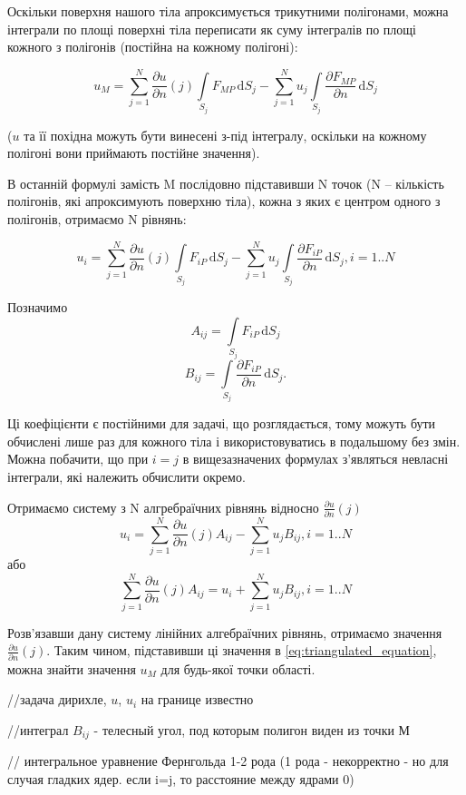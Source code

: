 \documentclass[a4paper,12pt]{article}
\begin{document}
Оскільки поверхня нашого тіла апроксимується трикутними полігонами, можна інтеграли по площі поверхні тіла переписати як суму інтегралів по площі кожного з полігонів (постійна на кожному полігоні):

\begin{equation} \label{eq:triangulated_equation}
u_M = \sum_{j=1}^{N} \frac{\partial u}{\partial n}(j) \int\limits_{S_j} F_{MP} \, \mathrm{d}S_j - \sum_{j=1}^{N} u_j \int\limits_{S_j} \frac{\partial F_{MP}}{\partial n} \, \mathrm{d}S_j
\end{equation}

($u$ та її похідна можуть бути винесені з-під інтегралу, оскільки на кожному полігоні вони приймають постійне значення).

В останній формулі замість M послідовно підставивши N точок (N -- кількість полігонів, які апроксимують поверхню тіла), кожна з яких є центром одного з полігонів, отримаємо N рівнянь:

\[
u_i = \sum_{j=1}^{N} \frac{\partial u}{\partial n}(j) \int\limits_{S_j} F_{iP} \, \mathrm{d}S_j - \sum_{j=1}^{N} u_j \int\limits_{S_j} \frac{\partial F_{iP}}{\partial n} \, \mathrm{d}S_j, i = 1..N
\]

Позначимо
\[A_{ij} = \int\limits_{S_j} F_{iP} \, \mathrm{d}S_j\]
\[B_{ij} = \int\limits_{S_j} \frac{\partial F_{iP}}{\partial n} \, \mathrm{d}S_j.\]

Ці коефіцієнти є постійними для задачі, що розглядається, тому можуть бути обчислені лише раз для кожного тіла і використовуватись в подальшому без змін. Можна побачити, що при $i = j$ в вищезазначених формулах з’являться невласні інтеграли, які належить обчислити окремо.

Отримаємо систему з N алгребраїчних рівнянь відносно $\frac{\partial u}{\partial n}(j)$
\[
u_i = \sum_{j=1}^{N} \frac{\partial u}{\partial n}(j) A_{ij} - \sum_{j=1}^{N} u_j B_{ij}, i = 1..N
\]
або
\[
\sum_{j=1}^{N} \frac{\partial u}{\partial n}(j) A_{ij} = u_i + \sum_{j=1}^{N} u_j B_{ij}, i = 1..N
\]

Розв’язавши дану систему лінійних алгебраїчних рівнянь, отримаємо значення $\frac{\partial u}{\partial n}(j)$. Таким чином, підставивши ці значення в \ref{eq:triangulated_equation}, можна знайти значення $u_M$ для будь-якої точки області.

//задача дирихле, $u$, $u_i$ на границе известно

//интеграл $B_{ij}$ - телесный угол, под которым полигон виден из точки М

// интегральное уравнение Фернгольда 1-2 рода (1 рода - некорректно - но для случая гладких ядер. если i=j, то расстояние между ядрами 0)
\end{document}

